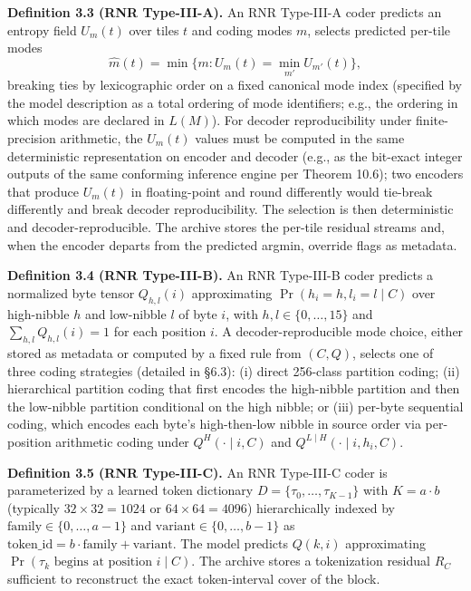 \documentclass[
]{article}
\begin{document}
\textbf{Definition 3.3 (RNR Type-III-A).} An RNR Type-III-A coder
predicts an entropy field $U_m(t)$ over tiles $t$ and coding modes
$m$, selects predicted per-tile modes
\[
\hat{m}(t) = \min \{ m : U_m(t) = \min_{m'} U_{m'}(t) \},
\]
breaking ties by lexicographic order on a fixed canonical mode
index (specified by the model description as a total ordering of
mode identifiers; e.g., the ordering in which modes are declared in
$L(M)$). For decoder reproducibility under finite-precision
arithmetic, the $U_m(t)$ values must be computed in the same
deterministic representation on encoder and decoder (e.g., as the
bit-exact integer outputs of the same conforming inference engine
per Theorem 10.6); two encoders that produce $U_m(t)$ in
floating-point and round differently would tie-break differently
and break decoder reproducibility. The selection is then
deterministic and decoder-reproducible. The archive stores the
per-tile residual streams and, when the encoder departs from the
predicted argmin, override flags as metadata.

\textbf{Definition 3.4 (RNR Type-III-B).} An RNR Type-III-B coder
predicts a normalized byte tensor $Q_{h, l}(i)$ approximating
$\Pr(h_i = h, l_i = l \mid C)$ over high-nibble $h$ and low-nibble $l$
of byte $i$, with $h, l \in \{0, \ldots, 15\}$ and
$\sum_{h, l} Q_{h, l}(i) = 1$ for each position $i$. A
decoder-reproducible mode choice, either stored as metadata or
computed by a fixed rule from $(C, Q)$, selects one of three coding
strategies (detailed in §6.3): (i) direct 256-class partition
coding; (ii) hierarchical partition coding that first encodes the
high-nibble partition and then the low-nibble partition conditional
on the high nibble; or (iii) per-byte sequential coding, which
encodes each byte's high-then-low nibble in source order via
per-position arithmetic coding under $Q^H(\cdot \mid i, C)$ and
$Q^{L \mid H}(\cdot \mid i, h_i, C)$.

\textbf{Definition 3.5 (RNR Type-III-C).} An RNR Type-III-C coder is
parameterized by a learned token dictionary
$D = \{\tau_0, \ldots, \tau_{K-1}\}$ with $K = a \cdot b$ (typically
$32 \times 32 = 1024$ or $64 \times 64 = 4096$) hierarchically indexed
by $\text{family} \in \{0, \ldots, a-1\}$ and
$\text{variant} \in \{0, \ldots, b-1\}$ as
$\text{token\_id} = b \cdot \text{family} + \text{variant}$. The
model predicts $Q(k, i)$ approximating
$\Pr(\tau_k \text{ begins at position } i \mid C)$.
The archive stores a tokenization residual $R_C$ sufficient to
reconstruct the exact token-interval cover of the block.
\end{document}
